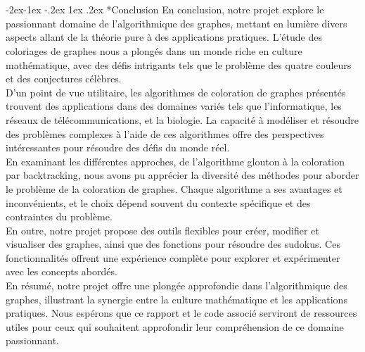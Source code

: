 \documentclass{report}
\makeatletter
\renewcommand\subsection{\@startsection{subsection}{2}{\z@}%
  {-2ex\@plus -1ex \@minus -.2ex}%
  {1ex \@plus .2ex}%
  {\normalfont\bfseries}}
\makeatother
\begin{document}
\chapter{}
\section*{}
\subsection*{Conclusion}
\hspace{2em}En conclusion, notre projet explore le passionnant domaine de l'algorithmique des graphes, mettant en lumière divers aspects allant de la théorie pure à des applications pratiques. L'étude des coloriages de graphes nous a plongés dans un monde riche en culture mathématique, avec des défis intrigants tels que le problème des quatre couleurs et des conjectures célèbres.\\
\hspace{2em}D'un point de vue utilitaire, les algorithmes de coloration de graphes présentés trouvent des applications dans des domaines variés tels que l'informatique, les réseaux de télécommunications, et la biologie. La capacité à modéliser et résoudre des problèmes complexes à l'aide de ces algorithmes offre des perspectives intéressantes pour résoudre des défis du monde réel.\\
\hspace{2em}En examinant les différentes approches, de l'algorithme glouton à la coloration par backtracking, nous avons pu apprécier la diversité des méthodes pour aborder le problème de la coloration de graphes. Chaque algorithme a ses avantages et inconvénients, et le choix dépend souvent du contexte spécifique et des contraintes du problème.\\
\hspace{2em}En outre, notre projet propose des outils flexibles pour créer, modifier et visualiser des graphes, ainsi que des fonctions pour résoudre des sudokus. Ces fonctionnalités offrent une expérience complète pour explorer et expérimenter avec les concepts abordés.\\
\hspace{2em}En résumé, notre projet offre une plongée approfondie dans l'algorithmique des graphes, illustrant la synergie entre la culture mathématique et les applications pratiques. Nous espérons que ce rapport et le code associé serviront de ressources utiles pour ceux qui souhaitent approfondir leur compréhension de ce domaine passionnant.\\
\end{document}
